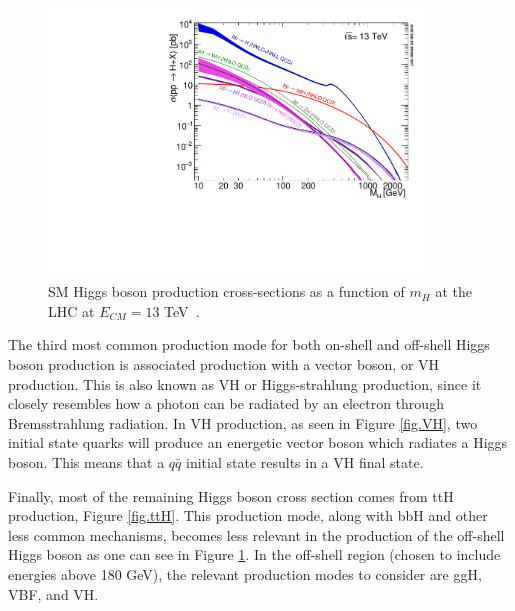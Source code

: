 \begin{figure}[!h]
\centering
\includegraphics[width=0.9\textwidth,clip] {figures/plotAll_13tev_BSM_sqrt.pdf}
\caption{SM Higgs boson production cross-sections as a function of $m_{H}$ at the LHC at $E_{CM}=13$ TeV~\cite{YR4}.}
\label{fig:prodModes}
\end{figure}

The third most common production mode for both on-shell and off-shell Higgs boson production is associated production with a vector boson, or VH production. This is also known as VH or Higgs-strahlung production, since it closely resembles how a photon can be radiated by an electron through Bremsstrahlung radiation. In VH production, as seen in Figure \ref{fig.VH}, two initial state quarks will produce an energetic vector boson which radiates a Higgs boson. This means that a $q\bar{q}$ initial state results in a VH final state. 

Finally, most of the remaining Higgs boson cross section comes from ttH production, Figure \ref{fig.ttH}. This production mode, along with bbH and other less common mechanisms, becomes less relevant in the production of the off-shell Higgs boson as one can see in Figure \ref{fig:prodModes}. In the off-shell region (chosen to include energies above 180 GeV), the relevant production modes to consider are ggH, VBF, and VH. 

